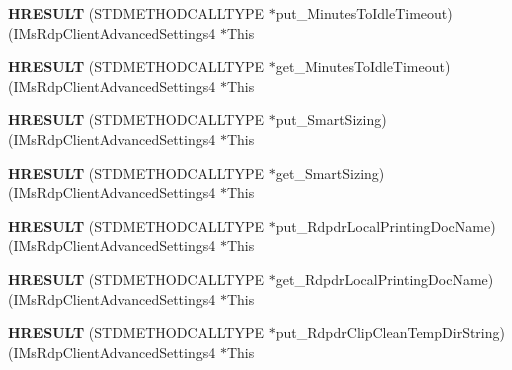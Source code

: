 \begin{DoxyCompactItemize}
{\bfseries H\+R\+E\+S\+U\+LT} (S\+T\+D\+M\+E\+T\+H\+O\+D\+C\+A\+L\+L\+T\+Y\+PE $\ast$put\+\_\+\+Minutes\+To\+Idle\+Timeout)(I\+Ms\+Rdp\+Client\+Advanced\+Settings4 $\ast$This
\item 
\mbox{\label{struct_i_ms_rdp_client_advanced_settings4_vtbl_a3bb8f57a95680ce7170dc238491932b9}} 
{\bfseries H\+R\+E\+S\+U\+LT} (S\+T\+D\+M\+E\+T\+H\+O\+D\+C\+A\+L\+L\+T\+Y\+PE $\ast$get\+\_\+\+Minutes\+To\+Idle\+Timeout)(I\+Ms\+Rdp\+Client\+Advanced\+Settings4 $\ast$This
\item 
\mbox{\label{struct_i_ms_rdp_client_advanced_settings4_vtbl_a590116766c031bd74d2e2097d91de0bc}} 
{\bfseries H\+R\+E\+S\+U\+LT} (S\+T\+D\+M\+E\+T\+H\+O\+D\+C\+A\+L\+L\+T\+Y\+PE $\ast$put\+\_\+\+Smart\+Sizing)(I\+Ms\+Rdp\+Client\+Advanced\+Settings4 $\ast$This
\item 
\mbox{\label{struct_i_ms_rdp_client_advanced_settings4_vtbl_a04dc172f593385b87557fe3a00b68e71}} 
{\bfseries H\+R\+E\+S\+U\+LT} (S\+T\+D\+M\+E\+T\+H\+O\+D\+C\+A\+L\+L\+T\+Y\+PE $\ast$get\+\_\+\+Smart\+Sizing)(I\+Ms\+Rdp\+Client\+Advanced\+Settings4 $\ast$This
\item 
\mbox{\label{struct_i_ms_rdp_client_advanced_settings4_vtbl_adc9a5b4904e927f5ee1bcba60bd3fb38}} 
{\bfseries H\+R\+E\+S\+U\+LT} (S\+T\+D\+M\+E\+T\+H\+O\+D\+C\+A\+L\+L\+T\+Y\+PE $\ast$put\+\_\+\+Rdpdr\+Local\+Printing\+Doc\+Name)(I\+Ms\+Rdp\+Client\+Advanced\+Settings4 $\ast$This
\item 
\mbox{\label{struct_i_ms_rdp_client_advanced_settings4_vtbl_a25eb21634cc3b09de468d5ff41e8c8b8}} 
{\bfseries H\+R\+E\+S\+U\+LT} (S\+T\+D\+M\+E\+T\+H\+O\+D\+C\+A\+L\+L\+T\+Y\+PE $\ast$get\+\_\+\+Rdpdr\+Local\+Printing\+Doc\+Name)(I\+Ms\+Rdp\+Client\+Advanced\+Settings4 $\ast$This
\item 
\mbox{\label{struct_i_ms_rdp_client_advanced_settings4_vtbl_ac53562146e638fe7dda70e997e009534}} 
{\bfseries H\+R\+E\+S\+U\+LT} (S\+T\+D\+M\+E\+T\+H\+O\+D\+C\+A\+L\+L\+T\+Y\+PE $\ast$put\+\_\+\+Rdpdr\+Clip\+Clean\+Temp\+Dir\+String)(I\+Ms\+Rdp\+Client\+Advanced\+Settings4 $\ast$This

\end{DoxyCompactItemize}
